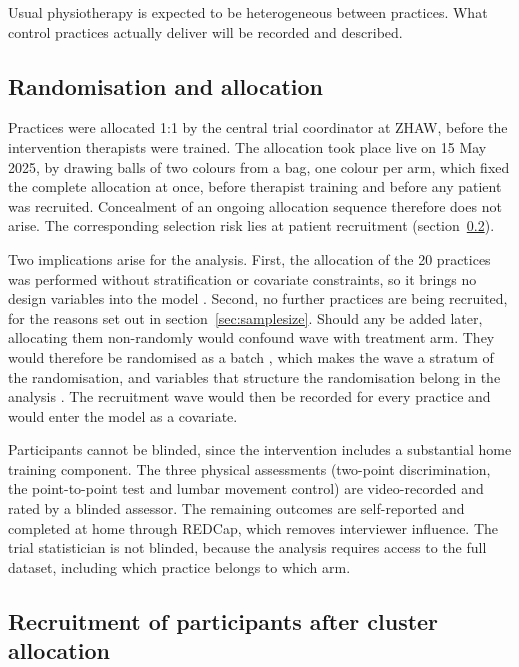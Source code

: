 \documentclass[11pt,a4paper]{article}
\begin{document}
Usual physiotherapy is expected to be heterogeneous between practices. What
control practices actually deliver will be recorded and described.

\subsection{Randomisation and allocation}
\label{sec:randomisation}

Practices were allocated 1:1 by the central trial coordinator at ZHAW,
before the intervention therapists were trained. The allocation
took place live on 15 May 2025, by drawing balls of two colours from a bag,
one colour per arm, which fixed the complete allocation at once, before
therapist training and before any patient was recruited. Concealment of an ongoing
allocation sequence therefore does not arise. The corresponding selection
risk lies at patient recruitment (section~\ref{sec:recruitment}).

Two implications arise for the analysis. First, the allocation of the 20
practices was performed without stratification or covariate constraints, so
it brings no design variables into the model \citep{kahan2012, hemming2023}.
Second, no further practices are being recruited, for the reasons set out in
section~\ref{sec:samplesize}. Should any be added later, allocating them
non-randomly would confound wave with treatment arm. They would therefore be
randomised as a batch \citep{ivers2012, moulton2004}, which makes the wave a
stratum of the randomisation, and variables that structure the randomisation
belong in the analysis \citep{kahan2012}. The recruitment wave would then be
recorded for every practice and would enter the model as a covariate.

Participants cannot be blinded, since the intervention includes a substantial
home training component. The three physical assessments (two-point
discrimination, the point-to-point test and lumbar movement control) are
video-recorded and rated by a blinded assessor. The remaining outcomes are
self-reported and completed at home through REDCap, which removes interviewer
influence. The trial statistician is not blinded, because the analysis
requires access to the full dataset, including which practice belongs to
which arm.

\subsection{Recruitment of participants after cluster allocation}
\label{sec:recruitment}
\end{document}
